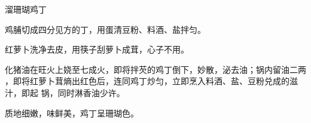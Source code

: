 \begin{recipe}{溜珊瑚鸡丁}

\ingredients


\preparation

\step 鸡脯切成四分见方的丁，用蛋清豆粉、料酒、盐拌匀。

\step 红萝卜洗净去皮，用筷子刮萝卜成茸，心子不用。

\step 化猪油在旺火上娆至七成火，即将拌芡的鸡丁倒下，妙散，泌去油；锅内留油二两
，即将红萝卜茸熵出红色后，连同鸡丁炒匀，立即烹入料酒、盐、豆粉兑成的滋汁，即起
锅，同时淋香油少许。

\features

质地细嫩，味鲜美，鸡丁呈珊瑚色。

\end{recipe}

